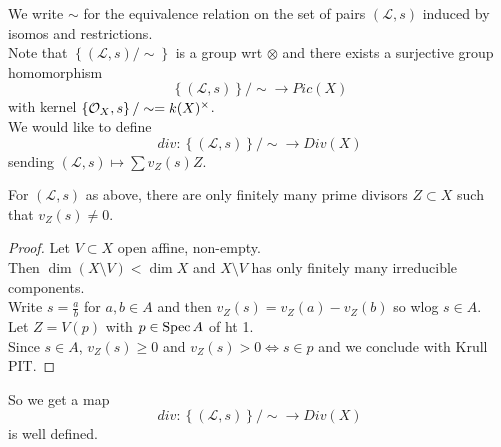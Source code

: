 \documentclass[../main.tex]{subfiles}
\begin{document}
We write $\sim$ for the equivalence relation on the set of pairs $ (  \mathcal{L},s) $ induced by isomos and restrictions.\\
Note that $ \left\{ (  \mathcal{L},s) / \sim \right\} $ is a group wrt $\otimes$ and there exists a surjective group homomorphism
\[ 
 \left\{ ( \mathcal{L},s)  \right\} / \sim \to Pic( X) 
\]
with kernel $ \left\{ \mathcal{O}_X,s \right\} / \sim= k( X)^{\times}$.\\
We would like to define
\[ 
div: \left\{ ( \mathcal{L},s)  \right\} /\sim \to Div( X) 
\]
sending $ (  \mathcal{L},s) \mapsto \sum v_Z( s) Z$.
\begin{lemma}
For $ ( \mathcal{L},s) $ as above, there are only finitely many prime divisors $Z \subset X$ such that $v_Z( s) \neq 0$.
\begin{proof}
Let $V \subset X$ open affine, non-empty.\\
Then $\dim ( X\setminus V) < \dim X$ and $X\setminus V$ has only finitely many irreducible components.\\
Write $s=\frac{a}{b}$ for $a,b \in A$ and then $v_Z( s) = v_Z(a )- v_Z ( b)   $ so wlog $s\in A$.\\
Let $Z = V( p) $ with $p \in \operatorname{Spec} A$  of ht 1.\\
Since $s\in A$, $v_Z( s) \geq 0$ and $v_Z( s) >0 \iff s\in p$ and we conclude with Krull PIT.
\end{proof}
\end{lemma}
So we get a map
\[ 
div: \left\{ ( \mathcal{L},s)  \right\} / \sim \to Div( X) 
\]
is well defined.
\end{document}
